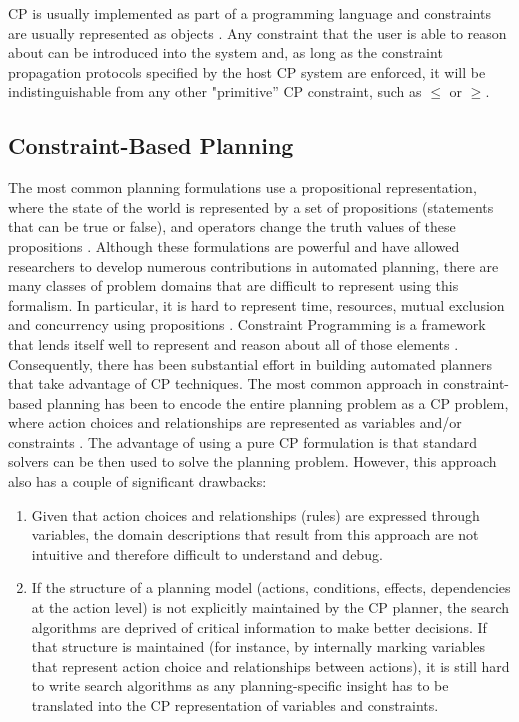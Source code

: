 {\textsf{CP} is usually implemented as part of a programming language
and constraints are usually represented as objects \cite{puget95}. Any
constraint that the user is able to reason about can be introduced
into the system and, as long as the constraint propagation protocols
specified by the host \textsf{CP} system are enforced, it will be
indistinguishable from any other "primitive'' \textsf{CP} constraint,
such as $\leq$ or $\geq$.

\subsection{Constraint-Based Planning}
\label{sec:europa:cp}

The most common planning formulations use a propositional
representation, where the state of the world is represented by a set
of propositions (statements that can be true or false), and operators
change the truth values of these propositions \cite{gen87}. Although
these formulations are powerful and have allowed researchers to
develop numerous contributions in automated planning, there are many
classes of problem domains that are difficult to represent using this
formalism. In particular, it is hard to represent time, resources,
mutual exclusion and concurrency using propositions \cite{ghallab04}.
Constraint Programming is a framework that lends itself well to
represent and reason about all of those elements \cite{ghallab94}.
Consequently, there has been substantial effort in building automated
planners that take advantage of \textsf{CP} techniques.  The most
common approach in constraint-based planning has been to encode the
entire planning problem as a \textsf{CP} problem, where action choices
and relationships are represented as variables and/or constraints
\cite{do01,vanbeek99,vossen99,wolfman99}.  The advantage of using a
pure \textsf{CP} formulation is that standard solvers can be then used
to solve the planning problem. However, this approach also has a
couple of significant drawbacks:

\begin{enumerate} 

\item Given that action choices and relationships (rules) are
  expressed through variables, the domain descriptions that result
  from this approach are not intuitive and therefore difficult to
  understand and debug.

\item If the structure of a planning model (actions, conditions,
  effects, dependencies at the action level) is not explicitly
  maintained by the \textsf{CP} planner, the search algorithms are
  deprived of critical information to make better decisions. If that
  structure is maintained (for instance, by internally marking
  variables that represent action choice and relationships between
  actions), it is still hard to write search algorithms as any
  planning-specific insight has to be translated into the \textsf{CP}
  representation of variables and constraints.
  

\end{enumerate}}
